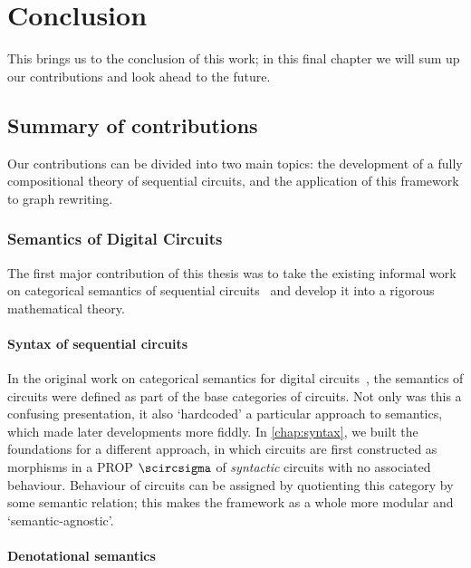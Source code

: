 \chapter{Conclusion}

This brings us to the conclusion of this work; in this final chapter we will sum
up our contributions and look ahead to the future.

\section{Summary of contributions}

Our contributions can be divided into two main topics: the development of a
fully compositional theory of sequential circuits, and the application of this
framework to graph rewriting.

\subsection{Semantics of Digital Circuits}

The first major contribution of this thesis was to take the existing informal
work on categorical semantics of sequential
circuits~\cite{ghica2016categorical,ghica2017diagrammatic} and develop it into
a rigorous mathematical theory.

\subsubsection{Syntax of sequential circuits}

In the original work on categorical semantics for digital
circuits~\cite{ghica2016categorical}, the semantics of circuits were defined as
part of the base categories of circuits.
Not only was this a confusing presentation, it also `hardcoded' a particular
approach to semantics, which made later developments more fiddly.
In \cref{chap:syntax}, we built the foundations for a different approach, in
which circuits are first constructed as morphisms in a PROP \(\scircsigma\) of
\emph{syntactic} circuits with no associated behaviour.
Behaviour of circuits can be assigned by quotienting this category by some
semantic relation; this makes the framework as a whole more modular and
`semantic-agnostic'.

\subsubsection{Denotational semantics}

